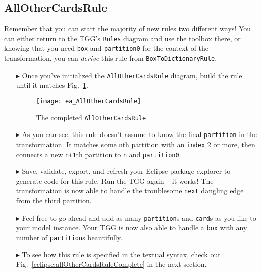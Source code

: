 \newpage
\hypertarget{allCards vis}{}
\subsection{AllOtherCardsRule}
\visHeader

Remember that you can start the majority of new rules two different ways! You can either return to the TGG's \texttt{Rules} diagram and use the toolbox
there, or knowing that you need \texttt{box} and \texttt{partition0} for the context of the transformation, you can \emph{derive} this rule from 
\texttt{BoxToDictionaryRule}.

\begin{itemize}

\item[$\blacktriangleright$] Once you've initialized the \texttt{AllOtherCardsRule} diagram, build the rule until it matches
Fig.~\ref{fig:ea_allOtherCardsRuleComplete}.

\begin{figure}[htbp]
\begin{center}
  \texttt{[image: ea\_AllOtherCardsRule]}
  \caption{The completed \texttt{AllOtherCardsRule}}
  \label{fig:ea_allOtherCardsRuleComplete}
\end{center}
\end{figure}

\item[$\blacktriangleright$] As you can see, this rule doesn't assume to know the final \texttt{partition} in the transformation. It matches some
\texttt{n}th partition with an \texttt{index} 2 or more, then connects a new \texttt{n+1}th partition to \texttt{n} and \texttt{partition0}. 

\item[$\blacktriangleright$] Save, validate, export, and refresh your Eclipse package explorer to generate code for this rule. Run the TGG again -- it works!
The transformation is now able to handle the troublesome \texttt{next} dangling edge from the third partition.

\item[$\blacktriangleright$] Feel free to go ahead and add as many \texttt{partition}s and \texttt{card}s as you like to your model instance. Your TGG is now
also able to handle a \texttt{box} with any number of \texttt{partition}s beautifully. 

\item[$\blacktriangleright$] To see how this rule is specified in the textual syntax, check out Fig.~\ref{eclipse:allOtherCardsRuleComplete} in the next
section.


\end{itemize}
